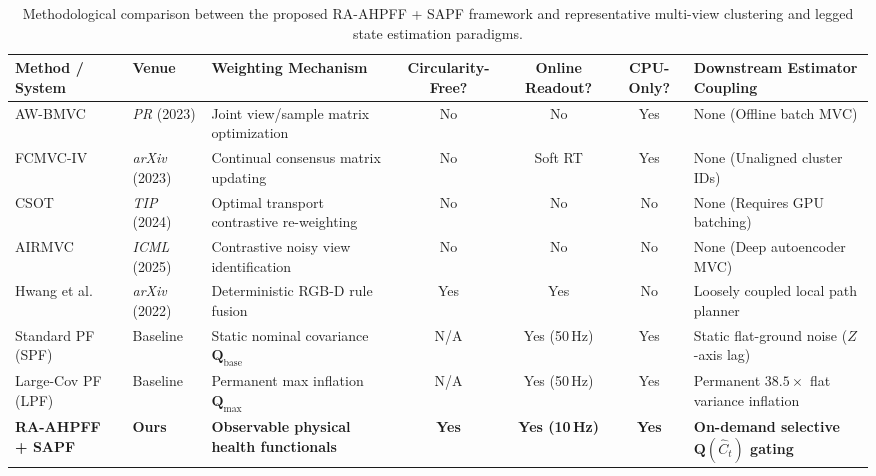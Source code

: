 \documentclass[11pt, a4paper]{article}
\begin{document}
\begin{table}[htbp]
    \centering
    \caption{Methodological comparison between the proposed RA-AHPFF + SAPF framework and representative multi-view clustering and legged state estimation paradigms.}
    \label{tab:sota_comparison}
    \footnotesize
    \setlength{\tabcolsep}{3.5pt}
    \begin{tabularx}{\textwidth}{l l X c c c X}
        \toprule
        \textbf{Method / System} & \textbf{Venue} & \textbf{Weighting Mechanism} & \textbf{Circularity-Free?} & \textbf{Online Readout?} & \textbf{CPU-Only?} & \textbf{Downstream Estimator Coupling} \\
        \midrule
        AW-BMVC \cite{houfar2023automatically} & \textit{PR} (2023) & Joint view/sample matrix optimization & No & No & Yes & None (Offline batch MVC) \\
        FCMVC-IV \cite{wan2023fast} & \textit{arXiv} (2023) & Continual consensus matrix updating & No & Soft RT & Yes & None (Unaligned cluster IDs) \\
        CSOT \cite{zhang2024learning} & \textit{TIP} (2024) & Optimal transport contrastive re-weighting & No & No & No & None (Requires GPU batching) \\
        AIRMVC \cite{airmvc2025} & \textit{ICML} (2025) & Contrastive noisy view identification & No & No & No & None (Deep autoencoder MVC) \\
        Hwang et al. \cite{hwang2022system} & \textit{arXiv} (2022) & Deterministic RGB-D rule fusion & Yes & Yes & No & Loosely coupled local path planner \\
        Standard PF (SPF) \cite{thrun2005probabilistic} & Baseline & Static nominal covariance $\mathbf{Q}_{\text{base}}$ & N/A & Yes (50\,Hz) & Yes & Static flat-ground noise ($Z$-axis lag) \\
        Large-Cov PF (LPF) & Baseline & Permanent max inflation $\mathbf{Q}_{\max}$ & N/A & Yes (50\,Hz) & Yes & Permanent $38.5\times$ flat variance inflation \\
        \midrule
        \textbf{RA-AHPFF + SAPF} & \textbf{Ours} & \textbf{Observable physical health functionals} & \textbf{Yes} & \textbf{Yes (10\,Hz)} & \textbf{Yes} & \textbf{On-demand selective $\mathbf{Q}(\hat{C}_t)$ gating} \\
        \bottomrule
    \end{tabularx}
\end{table}

\end{document}
